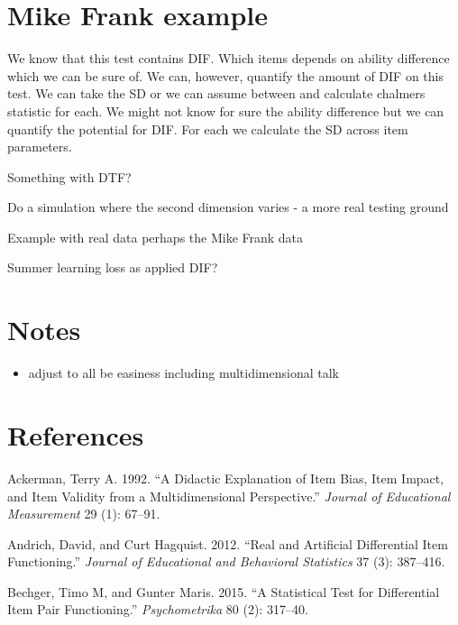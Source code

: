 \documentclass[
  11pt,
]{article}
\providecommand{\tightlist}{%
  \setlength{\itemsep}{0pt}\setlength{\parskip}{0pt}}
\begin{document}
\hypertarget{mike-frank-example}{%
\section{Mike Frank example}\label{mike-frank-example}}

We know that this test contains DIF. Which items depends on ability difference which we can be sure of. We can, however, quantify the amount of DIF on this test. We can take the SD or we can assume between and calculate chalmers statistic for each. We might not know for sure the ability difference but we can quantify the potential for DIF. For each we calculate the SD across item parameters.

Something with DTF?

Do a simulation where the second dimension varies - a more real testing ground

Example with real data perhaps the Mike Frank data

Summer learning loss as applied DIF?

\clearpage

\hypertarget{notes}{%
\section{Notes}\label{notes}}

\begin{itemize}
\tightlist
\item
  adjust to all be easiness including multidimensional talk
\end{itemize}

\hypertarget{references}{%
\section{References}\label{references}}




\hypertarget{refs}{}
\leavevmode\hypertarget{ref-ackerman1992didactic}{}%
Ackerman, Terry A. 1992. ``A Didactic Explanation of Item Bias, Item Impact, and Item Validity from a Multidimensional Perspective.'' \emph{Journal of Educational Measurement} 29 (1): 67--91.

\leavevmode\hypertarget{ref-andrich2012real}{}%
Andrich, David, and Curt Hagquist. 2012. ``Real and Artificial Differential Item Functioning.'' \emph{Journal of Educational and Behavioral Statistics} 37 (3): 387--416.

\leavevmode\hypertarget{ref-bechger2015statistical}{}%
Bechger, Timo M, and Gunter Maris. 2015. ``A Statistical Test for Differential Item Pair Functioning.'' \emph{Psychometrika} 80 (2): 317--40.
\end{document}
